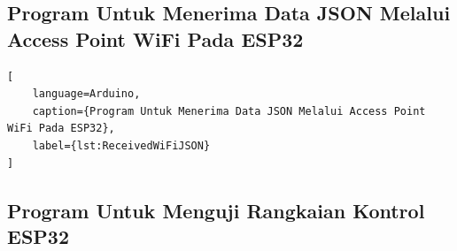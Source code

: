 \subsection{Program Untuk Menerima Data JSON Melalui Access Point WiFi Pada ESP32}

\begin{lstlisting}[
    language=Arduino,
    caption={Program Untuk Menerima Data JSON Melalui Access Point WiFi Pada ESP32},
    label={lst:ReceivedWiFiJSON}
]

\end{lstlisting}

\subsection{Program Untuk Menguji Rangkaian Kontrol ESP32}

